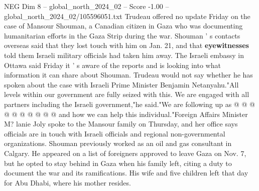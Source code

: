 \begin{textsample}{NEG Dim 8 – global\_north\_2024\_02 – Score -1.00 – global\_north\_2024\_02/105596051.txt}
Trudeau offered no update Friday on the case of Mansour Shouman, a Canadian citizen in Gaza who was documenting humanitarian efforts in the Gaza Strip during the war.
Shouman ' s contacts overseas said that they lost touch with him on Jan. 21, and that \textbf{eyewitnesses} told them Israeli military officials had taken him away.
The Israeli embassy in Ottawa said Friday it ' s aware of the reports and is looking into what information it can share about Shouman.
Trudeau would not say whether he has spoken about the case with Israeli Prime Minister Benjamin Netanyahu."All levels within our government are fully seized with this.
We are engaged with all partners including the Israeli government,"he said."We are following up as @ @ @ @ @ @ @ @ @ @ and how we can help this individual."Foreign Affairs Minister M? lanie Joly spoke to the Mansour family on Thursday, and her office says officials are in touch with Israeli officials and regional non-governmental organizations.
Shouman previously worked as an oil and gas consultant in Calgary.
He appeared on a list of foreigners approved to leave Gaza on Nov. 7, but he opted to stay behind in Gaza when his family left, citing a duty to document the war and its ramifications.
His wife and five children left that day for Abu Dhabi, where his mother resides.

\end{textsample}
